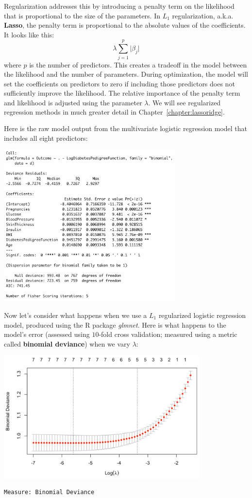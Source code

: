 Regularization addresses this by introducing a penalty term on the likelihood that is proportional to the size of the parameters. In $L_1$ regularization, a.k.a. \textbf{Lasso}, the penalty term is proportional to the absolute values of the coefficients. It looks like this:
$$ \lambda \sum_{j=1}^p \vert \beta_j \vert $$
where $p$ is the number of predictors. This creates a tradeoff in the model between the likelihood and the number of parameters. During optimization, the model will set the coefficients on predictors to zero if including those predictors does not sufficiently improve the likelihood. The relative importance of the penalty term and likelihood is adjusted using the parameter $\lambda$. We will see regularized regression methods in much greater detail in Chapter~\ref{chapter:lassoridge}. 

\begin{question}{}
Here is the raw model output from the multivariate logistic regression model that includes all eight predictors:
\begin{center}
\includegraphics[width=0.7\textwidth]{img/cor-example-multivar.png}
\end{center}
Now let's consider what happens when we use a $L_1$ regularized logistic regression model, produced using the R package \emph{glmnet}. Here is what happens to the model's error (assessed using $10$-fold cross validation; measured using a metric called \textbf{binomial deviance}) when we vary $\lambda$:
\begin{center}
\includegraphics[width=0.8\textwidth]{img/pima-glmnet-plot.png}
{\small
\begin{verbatim}
Measure: Binomial Deviance 


\end{verbatim}}
\end{center}
\end{question}
